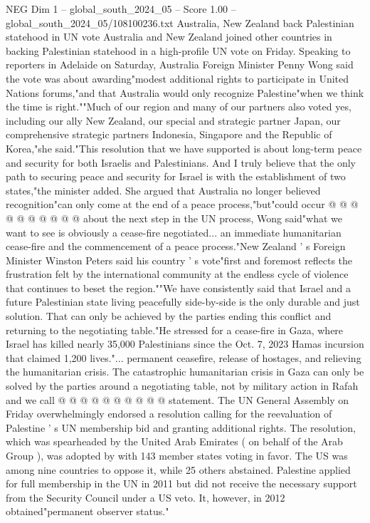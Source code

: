 \begin{textsample}{NEG Dim 1 – global\_south\_2024\_05 – Score 1.00 – global\_south\_2024\_05/108100236.txt}  \label{ex:f1_neg_374}
Australia, New Zealand back Palestinian statehood in UN vote Australia and New Zealand joined other countries in backing Palestinian statehood in a high-profile UN vote on Friday.
Speaking to reporters in Adelaide on Saturday, Australia Foreign Minister Penny Wong said the vote was about awarding"modest additional rights to participate in United Nations forums,"and that Australia would only recognize Palestine"when we think the time is right.""Much of our region and many of our partners also voted yes, including our ally New Zealand, our special and strategic partner Japan, our comprehensive strategic partners Indonesia, Singapore and the Republic of Korea,"she said."This resolution that we have supported is about long-term peace and security for both Israelis and Palestinians.
And I truly believe that the only path to securing peace and security for Israel is with the establishment of two states,"the minister added.
She argued that Australia no longer believed recognition"can only come at the end of a peace process,"but"could occur @ @ @ @ @ @ @ @ @ @ about the next step in the UN process, Wong said"what we want to see is obviously a cease-fire negotiated... an immediate humanitarian cease-fire and the commencement of a peace process."New Zealand ' s Foreign Minister Winston Peters said his country ' s vote"first and foremost reflects the frustration felt by the international community at the endless cycle of violence that continues to beset the region.""We have consistently said that Israel and a future Palestinian state living peacefully side-by-side is the only durable and just solution.
That can only be achieved by the parties ending this conflict and returning to the negotiating table."He stressed for a cease-fire in Gaza, where Israel has killed nearly 35,000 Palestinians since the Oct. 7, 2023 Hamas incursion that claimed 1,200 lives."... permanent ceasefire, release of hostages, and relieving the humanitarian crisis.
The catastrophic humanitarian crisis in Gaza can only be solved by the parties around a negotiating table, not by military action in Rafah and we call @ @ @ @ @ @ @ @ @ @ statement.
The UN General Assembly on Friday overwhelmingly endorsed a resolution calling for the reevaluation of Palestine ' s UN membership bid and granting additional rights.
The resolution, which was spearheaded by the United Arab Emirates ( on behalf of the Arab Group ), was adopted by with 143 member states voting in favor.
The US was among nine countries to oppose it, while 25 others abstained.
Palestine applied for full membership in the UN in 2011 but did not receive the necessary support from the Security Council under a US veto.
It, however, in 2012 obtained"permanent observer status."

\end{textsample}
